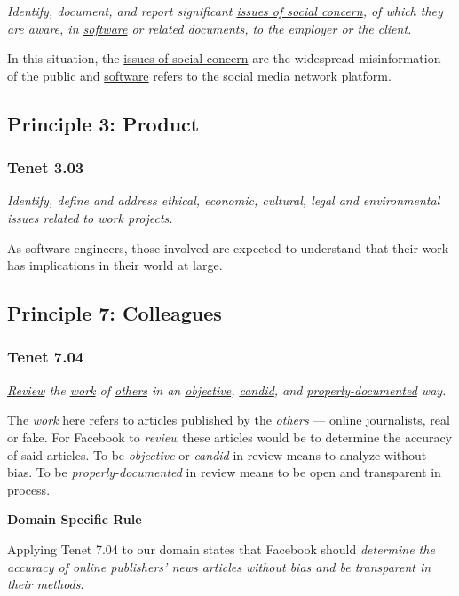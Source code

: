 \emph{Identify, document, and report significant \ul{issues of social concern}, of which they are aware, in \ul{software} or related documents, to the employer or the client. \cite{se_code}}

In this situation, the \ul{issues of social concern} are the widespread misinformation of the public and \ul{software} refers to the social media network platform.


\subsection{Principle 3: Product}

\subsubsection{Tenet 3.03}

\emph{Identify, define and address ethical, economic, cultural, legal and environmental issues related to work projects. \cite{se_code}}

As software engineers, those involved are expected to understand that their work has implications in their world at large.


\subsection{Principle 7: Colleagues}

\subsubsection{Tenet 7.04}

\emph{\ul{Review} the \ul{work} of \ul{others} in an \ul{objective}, \ul{candid}, and \ul{properly-documented} way. \cite{se_code}}

The \emph{work} here refers to articles published by the \emph{others} --- online journalists, real or fake. For Facebook to \emph{review} these articles would be to determine the accuracy of said articles. To be \emph{objective} or \emph{candid} in review means to analyze without bias. To be \emph{properly-documented} in review means to be open and transparent in process. \cite{dictionary}

%
%
\noindent \textbf{Domain Specific Rule}

Applying Tenet 7.04 to our domain states that Facebook should \emph{determine the accuracy of online publishers' news articles without bias and be transparent in their methods}.


